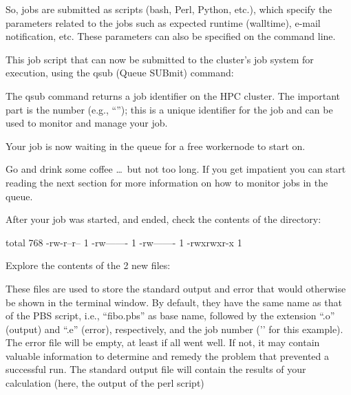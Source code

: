 
So, jobs are submitted as scripts (bash, Perl, Python, etc.), which specify the
parameters related to the jobs such as expected runtime (walltime), e-mail
notification, etc. These parameters can also be specified on the command line.

This job script that can now be submitted to the cluster's job system for
execution, using the qsub (Queue SUBmit) command:

\begin{prompt}
\end{prompt}

The qsub command returns a job identifier on the HPC cluster. The important
part is the number (e.g., ``\jobnumber''); this is a unique identifier for the job
and can be used to monitor and manage your job.

Your job is now waiting in the queue for a free workernode to start on.

Go and drink some coffee \dots\ but not too long. If you get impatient you can
start reading the next section for more information on how to monitor jobs in the queue.

After your job was started, and ended, check the contents of the directory:

\begin{prompt}
total 768
-rw-r--r-- 1 %
-rw------- 1 %
-rw------- 1 %
-rwxrwxr-x 1 %
\end{prompt}

Explore the contents of the 2 new files:

\begin{prompt}
\end{prompt}

These files are used to store the standard output and error that would
otherwise be shown in the terminal window. By default, they have the same name
as that of the PBS script, i.e., ``fibo.pbs'' as base name, followed by the
extension ``.o'' (output) and ``.e'' (error), respectively, and the job number
('\jobnumber' for this example). The error file will be empty, at least if all went
well. If not, it may contain valuable information to determine and remedy the
problem that prevented a successful run. The standard output file will contain
the results of your calculation (here, the output of the perl script)

